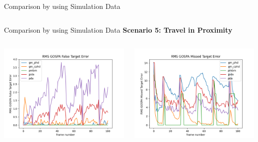 \documentclass[12pt]{beamer}
\begin{document}
\begin{frame}{Comparison by using Simulation Data}
\begin{columns}[t]
\begin{column}{0.5\linewidth}
  \end{column}
\end{columns}
\end{frame}

\begin{frame}{Comparison by using Simulation Data}
\textbf{Scenario 5: Travel in Proximity}
\begin{columns}[t]
  \begin{column}{0.5\linewidth}
      \centering
      \includegraphics[width=\linewidth,height=\textheight,keepaspectratio]{real_data/scenario6/gospa_false.png}\\
  \end{column}
    \begin{column}{0.5\linewidth}
      \centering
      \includegraphics[width=\linewidth,height=\textheight,keepaspectratio]{real_data/scenario6/missed.png}\\
  \end{column}
\end{columns}
\end{frame}
\end{document}
